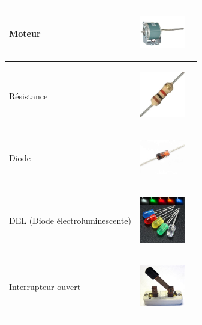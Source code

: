 \documentclass[11pt]{article}
\begin{document}
\begin{center}
\begin{tabular}{ |p{6cm}|p{6cm}|p{6cm}|  }
			Moteur	& 
			\begin{minipage}{.3\textwidth}
				\begin{center}
					\includegraphics[width=2cm]{moteur.jpg}
				\end{center}
			  \end{minipage}  &  \\\hline

			Résistance 					&  
			\begin{minipage}{.3\textwidth}
				\begin{center}
					\includegraphics[width=2cm]{resistance.jpg}
				\end{center}
			\end{minipage}  &  \\\hline


			Diode 						&  
			\begin{minipage}{.3\textwidth}
				\begin{center}
					\includegraphics[width=2cm]{diode.jpg}
				\end{center}
			  \end{minipage}  &  \\\hline

			DEL (Diode électroluminescente) 	&  
			\begin{minipage}{.3\textwidth}
				\begin{center}
					\includegraphics[width=2cm]{DEL.jpg}
				\end{center}
			  \end{minipage}  &  \\\hline

			
			  Interrupteur ouvert 		&
			  \begin{minipage}{.3\textwidth}
				  \begin{center}
					  \includegraphics[width=2cm]{interrupteur_ouvert.jpg}
				  \end{center}
				\end{minipage}  &  \\\hline
				

\end{tabular}
\end{center}
\end{document}

